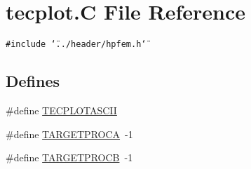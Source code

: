 \hypertarget{tecplot_8C}{
\section{tecplot.C File Reference}
\label{tecplot_8C}
}
{\tt \#include \char`\"{}../header/hpfem.h\char`\"{}}\par
\subsection*{Defines}
\begin{CompactItemize}
\item 
\#define \hyperlink{tecplot_8C_a0}{TECPLOTASCII}
\item 
\#define \hyperlink{tecplot_8C_a1}{TARGETPROCA}\ -1
\item 
\#define \hyperlink{tecplot_8C_a2}{TARGETPROCB}\ -1
\end{CompactItemize}
